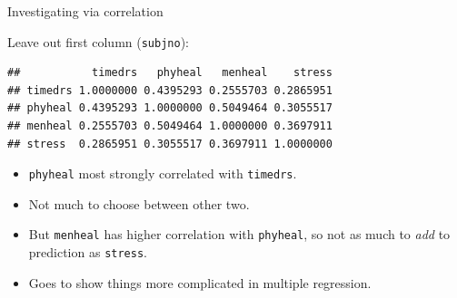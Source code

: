 \documentclass[ignorenonframetext,]{beamer}
\newenvironment{Shaded}{\begin{snugshade}}{\end{snugshade}}
\newcommand{\KeywordTok}[1]{\textcolor[rgb]{0.13,0.29,0.53}{\textbf{#1}}}
\newcommand{\NormalTok}[1]{#1}
\newcommand{\OperatorTok}[1]{\textcolor[rgb]{0.81,0.36,0.00}{\textbf{#1}}}
\newcommand{\StringTok}[1]{\textcolor[rgb]{0.31,0.60,0.02}{#1}}
\begin{document}
\begin{frame}[fragile]{Investigating via correlation}
\protect\hypertarget{investigating-via-correlation}{}

Leave out first column (\texttt{subjno}):

\begin{Shaded}
\end{Shaded}

\begin{verbatim}
##           timedrs   phyheal   menheal    stress
## timedrs 1.0000000 0.4395293 0.2555703 0.2865951
## phyheal 0.4395293 1.0000000 0.5049464 0.3055517
## menheal 0.2555703 0.5049464 1.0000000 0.3697911
## stress  0.2865951 0.3055517 0.3697911 1.0000000
\end{verbatim}

\begin{itemize}
\item
  \texttt{phyheal} most strongly correlated with \texttt{timedrs}.
\item
  Not much to choose between other two.
\item
  But \texttt{menheal} has higher correlation with \texttt{phyheal}, so
  not as much to \emph{add} to prediction as \texttt{stress}.
\item
  Goes to show things more complicated in multiple regression.
\end{itemize}

\end{frame}
\end{document}
